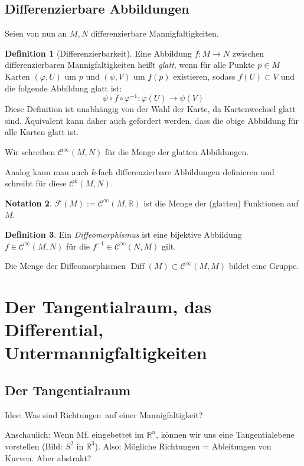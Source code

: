 \documentclass[a4paper]{scrreprt}
\numberwithin{equation}{chapter}
\DeclareMathOperator{\Diff}{Diff}
\newcommand{\R}{\mathbb{R}}
\newcommand{\sC}{\mathcal{C}^{\infty}}
\newcommand{\sm}{\mathcal{F}}
\theoremstyle{definition}
\newtheorem{defn}{Definition}[section]
\newtheorem{nota}[defn]{Notation}
\begin{document}
	\section{Differenzierbare Abbildungen}
		Seien von nun an $M,N$ differenzierbare Mannigfaltigkeiten.
		\begin{defn}[Differenzierbarkeit]
			Eine Abbildung $f\colon M\rightarrow N$ zwischen differenzierbaren Mannigfaltigkeiten heißt \emph{glatt}, wenn für alle Punkte $p\in M$ Karten $(\varphi,U)$ um  $p$ und $(\psi,V)$ um $f(p)$ existieren, sodass $f(U)\subset V$ und die folgende Abbildung glatt ist:
			\begin{equation}
				\psi\circ f \circ \varphi^{-1}\colon \varphi(U)\rightarrow \psi(V)
			\end{equation}
			Diese Definition ist unabhängig von der Wahl der Karte, da Kartenwechsel glatt sind. Äquivalent kann daher auch gefordert werden, dass die obige Abbildung für alle Karten glatt ist.

			Wir schreiben $\sC(M,N)$ für die Menge der glatten Abbildungen.
			
			Analog kann man auch $k$-fach differenzierbare Abbildungen definieren und schreibt für diese $\mathcal{C}^k(M,N)$.
		\end{defn}
		\begin{nota}
			$\sm(M):=\sC(M,\R)$ ist die Menge der (glatten) Funktionen auf $M$.
		\end{nota}
		\begin{defn}
			Ein \emph{Diffeomorphismus} ist eine bijektive Abbildung $f\in\sC(M,N)$ für die $f^{-1}\in\sC(N,M)$ gilt.

			Die Menge der Diffeomorphismen $\Diff(M)\subset\sC(M,M)$ bildet eine Gruppe.
		\end{defn}


\chapter{Der Tangentialraum, das Differential, Untermannigfaltigkeiten}

\section{Der Tangentialraum}
Idee: Was sind \glqq Richtungen\grqq\ auf einer Mannigfaltigkeit?

Anschaulich: Wenn Mf. eingebettet im $\mathbb R^n$, können wir uns eine Tangentialebene vorstellen (Bild: $S^2$ in $\mathbb R^3$). Also: Mögliche Richtungen = Ableitungen von Kurven. Aber abstrakt?
\end{document}
